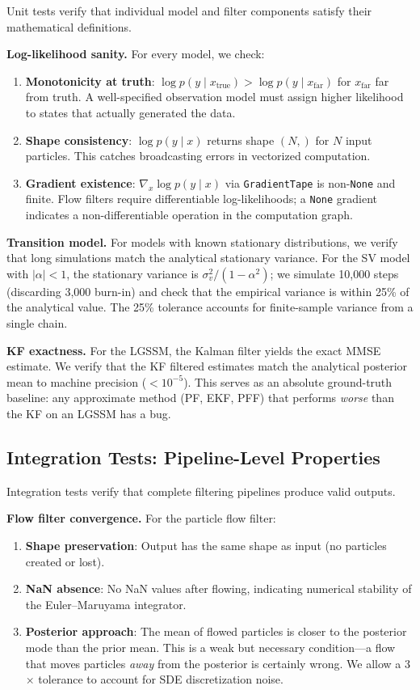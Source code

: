 \documentclass[12pt,a4paper]{article}
\theoremstyle{definition}
\theoremstyle{remark}
\begin{document}
Unit tests verify that individual model and filter components satisfy their mathematical definitions.

\textbf{Log-likelihood sanity.} For every model, we check:
\begin{enumerate}
	\item \textbf{Monotonicity at truth}: $\log p(y \mid x_{\text{true}}) > \log p(y \mid x_{\text{far}})$ for $x_{\text{far}}$ far from truth. A well-specified observation model must assign higher likelihood to states that actually generated the data.
	\item \textbf{Shape consistency}: $\log p(y \mid x)$ returns shape $(N,)$ for $N$ input particles. This catches broadcasting errors in vectorized computation.
	\item \textbf{Gradient existence}: $\nabla_x \log p(y \mid x)$ via \texttt{GradientTape} is non-\texttt{None} and finite. Flow filters require differentiable log-likelihoods; a \texttt{None} gradient indicates a non-differentiable operation in the computation graph.
\end{enumerate}

\textbf{Transition model.} For models with known stationary distributions, we verify that long simulations match the analytical stationary variance. For the SV model with $|\alpha| < 1$, the stationary variance is $\sigma_v^2 / (1 - \alpha^2)$; we simulate 10,000 steps (discarding 3,000 burn-in) and check that the empirical variance is within 25\% of the analytical value. The 25\% tolerance accounts for finite-sample variance from a single chain.

\textbf{KF exactness.} For the LGSSM, the Kalman filter yields the exact MMSE estimate. We verify that the KF filtered estimates match the analytical posterior mean to machine precision ($< 10^{-5}$). This serves as an absolute ground-truth baseline: any approximate method (PF, EKF, PFF) that performs \emph{worse} than the KF on an LGSSM has a bug.

\subsection{Integration Tests: Pipeline-Level Properties}

Integration tests verify that complete filtering pipelines produce valid outputs.

\textbf{Flow filter convergence.} For the particle flow filter:
\begin{enumerate}
	\item \textbf{Shape preservation}: Output has the same shape as input (no particles created or lost).
	\item \textbf{NaN absence}: No NaN values after flowing, indicating numerical stability of the Euler--Maruyama integrator.
	\item \textbf{Posterior approach}: The mean of flowed particles is closer to the posterior mode than the prior mean. This is a weak but necessary condition---a flow that moves particles \emph{away} from the posterior is certainly wrong. We allow a 3$\times$ tolerance to account for SDE discretization noise.
\end{enumerate}
\end{document}
